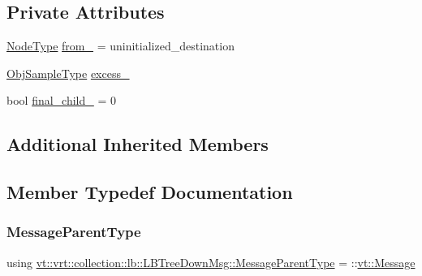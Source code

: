 \subsection*{Private Attributes}
\begin{DoxyCompactItemize}
\item 
\hyperlink{namespacevt_a866da9d0efc19c0a1ce79e9e492f47e2}{Node\+Type} \hyperlink{structvt_1_1vrt_1_1collection_1_1lb_1_1_l_b_tree_down_msg_a1f4c856f63f14073bf5713e1be6ae30e}{from\+\_\+} = uninitialized\+\_\+destination
\item 
\hyperlink{structvt_1_1vrt_1_1collection_1_1lb_1_1_hier_l_b_types_a597a60d517207b90e8c7984eac434e8f}{Obj\+Sample\+Type} \hyperlink{structvt_1_1vrt_1_1collection_1_1lb_1_1_l_b_tree_down_msg_a9e31b51089a40dc10dde88967a91af09}{excess\+\_\+}
\item 
bool \hyperlink{structvt_1_1vrt_1_1collection_1_1lb_1_1_l_b_tree_down_msg_abb94529b3dcc3611eaf2d242d8da2cdd}{final\+\_\+child\+\_\+} = 0
\end{DoxyCompactItemize}
\subsection*{Additional Inherited Members}


\subsection{Member Typedef Documentation}
\mbox{\label{structvt_1_1vrt_1_1collection_1_1lb_1_1_l_b_tree_down_msg_a519ac9259e7e931d2ec529c73917cc56}} 
\subsubsection{\texorpdfstring{Message\+Parent\+Type}{MessageParentType}}
{\footnotesize\ttfamily using \hyperlink{structvt_1_1vrt_1_1collection_1_1lb_1_1_l_b_tree_down_msg_a519ac9259e7e931d2ec529c73917cc56}{vt\+::vrt\+::collection\+::lb\+::\+L\+B\+Tree\+Down\+Msg\+::\+Message\+Parent\+Type} =  \+::\hyperlink{namespacevt_a3a3ddfef40b4c90915fa43cdd5f129ea}{vt\+::\+Message}}



